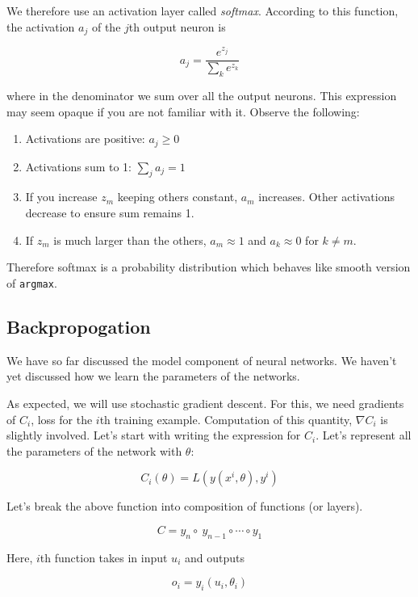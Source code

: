 \documentclass[a4paper]{tufte-handout}
\begin{document}
We therefore use an activation layer called \emph{softmax}. According to
this function, the activation \(a_j\) of the \(j\)th output neuron is

\[ a_j = \frac{e^{z_j}}{\sum_k e^{z_k}} \]

where in the denominator we sum over all the output neurons.
This expression may seem opaque if you are not familiar with it. Observe
the following:

\begin{enumerate}
\item
  Activations are positive: \(a_j \geq 0\)
\item
  Activations sum to 1: \(\sum_j a_j = 1\)
\item
  If you increase \(z_m\) keeping others constant, \(a_m\) increases.
  Other activations decrease to ensure sum remains 1.
\item
  If \(z_m\) is much larger than the others, \(a_m \approx 1\) and
  \(a_k \approx 0\) for \(k \neq m\).
\end{enumerate}

Therefore softmax is a probability distribution which behaves like
smooth version of \texttt{argmax}.

\subsection{Backpropogation}\label{backpropogation}

We have so far discussed the model component of neural networks. We
haven't yet discussed how we learn the parameters of the networks.

As expected, we will use stochastic gradient descent. For this, we need
gradients of \(C_i\), loss for the \(i\)th training example. Computation
of this quantity, \(\nabla C_i\) is slightly involved. Let's start with
writing the expression for \(C_i\). Let's represent all the parameters
of the network with \(\theta\):

\[ C_i(\theta) = L\left(y(x^i, \theta), y^i \right)\]

Let's break the above function into composition of functions (or
layers).

\[ C = y_n \circ \ y_{n-1} \circ \cdots \circ y_1 \]

Here, \(i\)th  function takes in input \(u_i\)
and outputs

\begin{equation}
o_i = y_i(u_i, \theta_i) \label{eq:1}
\end{equation}
\end{document}
